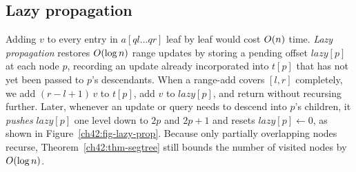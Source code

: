 \subsection{Lazy propagation}

Adding $v$ to every entry in $a[ql\dots qr]$ leaf by leaf would cost $O(n)$ time. \emph{Lazy propagation} restores $O(\log n)$ range updates by storing a pending offset $\textit{lazy}[p]$ at each node $p$, recording an update already incorporated into $t[p]$ that has not yet been passed to $p$'s descendants. When a range-add covers $[l,r]$ completely, we add $(r - l + 1)\,v$ to $t[p]$, add $v$ to $\textit{lazy}[p]$, and return without recursing further. Later, whenever an update or query needs to descend into $p$'s children, it \emph{pushes} $\textit{lazy}[p]$ one level down to $2p$ and $2p+1$ and resets $\textit{lazy}[p] \gets 0$, as shown in Figure~\ref{ch42:fig-lazy-prop}. Because only partially overlapping nodes recurse, Theorem~\ref{ch42:thm-segtree} still bounds the number of visited nodes by $O(\log n)$.

